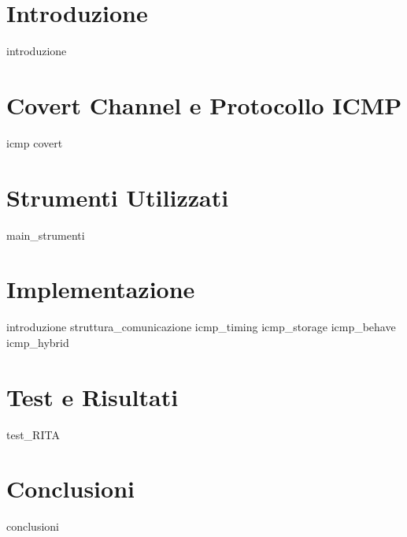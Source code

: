 \documentclass[a4paper,12 pt]{report}
\theoremstyle{definition}
\theoremstyle{remark}
\begin{document}
    
    
\tableofcontents \newpage
\listoffigures \newpage
\listoftables \newpage

\chapter{Introduzione} 
{introduzione} 
\chapter{Covert Channel e Protocollo ICMP} 
{icmp} 
{covert} 
\newpage 

\chapter{Strumenti Utilizzati}
{main_strumenti} 
\newpage   


\chapter{Implementazione} 
{introduzione} 
{struttura_comunicazione}  
{icmp_timing} 
{icmp_storage} 
{icmp_behave} 
{icmp_hybrid} 
\newpage 

\chapter{Test e Risultati} 
{test_RITA}  
\newpage  

%

\chapter{Conclusioni} 
{conclusioni} 




\end{document}
